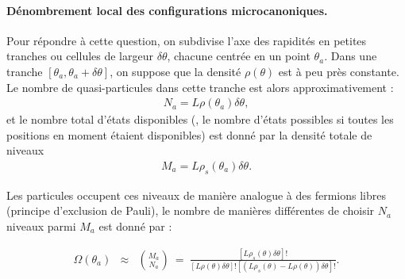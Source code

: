 \paragraph{Dénombrement local des configurations microcanoniques.}
Pour répondre à cette question, on subdivise l’axe des rapidités en petites tranches ou cellules de largeur $\delta \theta$, chacune centrée en un point $\theta_a$. Dans une tranche $[\theta_a, \theta_a + \delta\theta]$, on suppose que la densité $\rho(\theta)$ est à peu près constante. Le nombre de quasi-particules dans cette tranche est alors approximativement :
\begin{eqnarray*}
	N_a = L\rho(\theta_a) \delta \theta,
\end{eqnarray*}
et le nombre total d'états disponibles (\ie, le nombre d’états possibles si toutes les positions en moment étaient disponibles) est donné par la densité totale de niveaux 
\begin{eqnarray*}
	M_a = L\rho_s(\theta_a) \delta \theta.
\end{eqnarray*}

Les particules occupent ces niveaux de manière analogue à des fermions libres (principe d’exclusion de Pauli), le nombre de manières différentes de choisir $N_a$ niveaux parmi $M_a$ est donné par :
	
	
	\begin{figure}[H]
		\centering 
		\captionsetup{skip=10pt} %
	\end{figure}
	
	
\begin{eqnarray}
	\Omega(\theta_a) & \approx  & \binom{M_a}{N_a} ~= ~   \frac{[ L\rho_s ( \theta ) \delta \theta ] ! }{ [ L\rho ( \theta ) \delta \theta ] ! [( L\rho_s ( \theta ) - L\rho ( \theta ) )  \delta \theta ] ! }. 	
\end{eqnarray}

